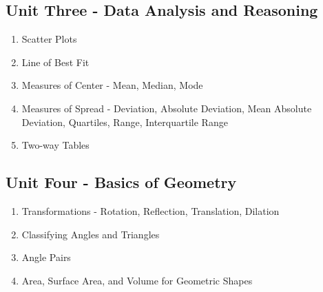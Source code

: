 \subsection{Unit Three - Data Analysis and Reasoning}
\begin{enumerate}
    \item Scatter Plots
    \item Line of Best Fit
    \item Measures of Center - Mean, Median, Mode
    \item Measures of Spread - Deviation, Absolute Deviation, Mean Absolute Deviation, Quartiles, Range, Interquartile Range
    \item Two-way Tables
\end{enumerate}
\subsection{Unit Four - Basics of Geometry}
\begin{enumerate}
    \item Transformations - Rotation, Reflection, Translation, Dilation
    \item Classifying Angles and Triangles
    \item Angle Pairs
    \item Area, Surface Area, and Volume for Geometric Shapes
\end{enumerate}